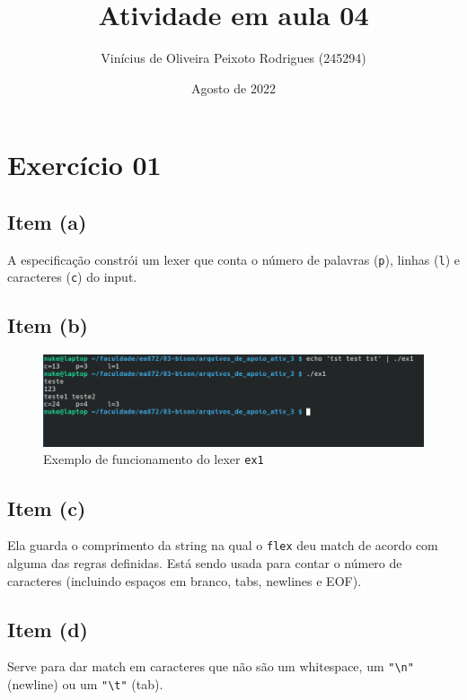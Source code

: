 \documentclass{article}
\title{Atividade em aula 04}
\author{Vinícius de Oliveira Peixoto Rodrigues (245294)}
\date{Agosto de 2022}
\begin{document}
\maketitle

\section*{Exercício 01}
\subsection*{Item (a)}

A especificação constrói um lexer que conta o número de palavras (\texttt{p}), linhas (\texttt{l}) e caracteres (\texttt{c}) do input.

\subsection*{Item (b)}
\begin{figure}[!ht]
    \begin{center}
        \includegraphics[width=\textwidth]{images/ex1_b.png}
        \caption{Exemplo de funcionamento do lexer \texttt{ex1}}
    \end{center}
\end{figure} 

\subsection*{Item (c)}

Ela guarda o comprimento da string na qual o \texttt{flex} deu match de acordo com alguma das regras definidas. Está sendo usada para contar o número de caracteres (incluindo espaços em branco, tabs, newlines e EOF).

\subsection*{Item (d)}

Serve para dar match em caracteres que não são um whitespace, um \texttt{"\textbackslash n"} (newline) ou um \texttt{"\textbackslash t"} (tab).
\end{document}

